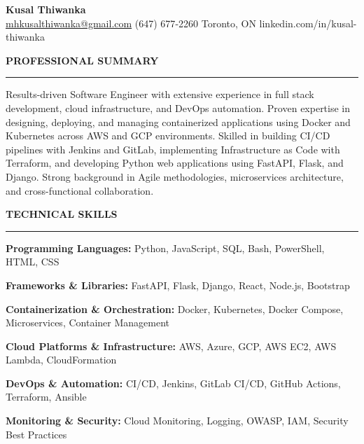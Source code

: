 \documentclass[10pt,letterpaper]{article}
\begin{document}
\begin{center}
{\LARGE\textbf{Kusal Thiwanka}}\\[3pt]
\href{mailto:mhkusalthiwanka@gmail.com}{mhkusalthiwanka@gmail.com}\hspace{2em}%
(647) 677{-}2260\hspace{2em}%
Toronto, ON\hspace{2em}
linkedin.com/in/kusal-thiwanka
\end{center}

\vspace{6pt}

\textbf{PROFESSIONAL SUMMARY}\\[-8pt]
\noindent\rule{\textwidth}{1pt}

\vspace{-2pt}

Results-driven Software Engineer with extensive experience in full stack development, cloud infrastructure, and DevOps automation. Proven expertise in designing, deploying, and managing containerized applications using Docker and Kubernetes across AWS and GCP environments. Skilled in building CI/CD pipelines with Jenkins and GitLab, implementing Infrastructure as Code with Terraform, and developing Python web applications using FastAPI, Flask, and Django. Strong background in Agile methodologies, microservices architecture, and cross-functional collaboration.

\vspace{8pt}

\textbf{TECHNICAL SKILLS}\\[-8pt]
\noindent\rule{\textwidth}{1pt}

\vspace{-2pt}

\textbf{Programming Languages:} Python, JavaScript, SQL, Bash, PowerShell, HTML, CSS

\textbf{Frameworks \& Libraries:} FastAPI, Flask, Django, React, Node.js, Bootstrap

\textbf{Containerization \& Orchestration:} Docker, Kubernetes, Docker Compose, Microservices, Container Management

\textbf{Cloud Platforms \& Infrastructure:} AWS, Azure, GCP, AWS EC2, AWS Lambda, CloudFormation

\textbf{DevOps \& Automation:} CI/CD, Jenkins, GitLab CI/CD, GitHub Actions, Terraform, Ansible

\textbf{Monitoring \& Security:} Cloud Monitoring, Logging, OWASP, IAM, Security Best Practices
\end{document}
